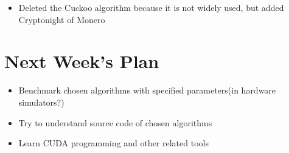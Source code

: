 \documentclass[11pt]{article}
\begin{document}
\begin{itemize}
\item Deleted the Cuckoo algorithm because it is not widely used, but added Cryptonight of Monero
\end{itemize}
%
%
\section{Next Week's Plan}
\begin{itemize}
\item Benchmark chosen algorithms with specified parameters(in hardware simulators?)
\item Try to understand source code of chosen algorithms
\item Learn CUDA programming and other related tools 
\end{itemize}



\end{document}
